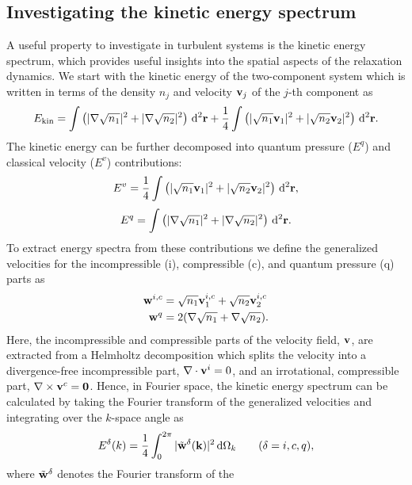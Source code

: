 \subsection{Investigating the kinetic energy spectrum}
A useful property to investigate in turbulent systems is the kinetic energy
spectrum, which provides useful insights into the spatial aspects of the
relaxation dynamics.
We start with the kinetic energy of the two-component system which is written
in terms of the density \(n_j\) and velocity \(\vb{v}_j\) of the \(j\)-th
component as
\begin{align}
    E_\mathrm{kin} = \int \left(|\nabla\sqrt{n_1}|^2
    + |\nabla\sqrt{n_2}|^2\right) \, \dd^2\vb{r} 
    + \frac{1}{4}\int \left(|\sqrt{n_1}\vb{v}_1|^2
    + |\sqrt{n_2}\vb{v}_2|^2\right) \, \dd^2\vb{r}.
\end{align}
The kinetic energy can be further decomposed into quantum pressure
(\( E^q\)) and classical velocity (\(E^v\)) contributions:
\begin{align}
    E^v = \frac{1}{4}\int \left(|\sqrt{n_1}\vb{v}_1|^2
    + |\sqrt{n_2}\vb{v}_2|^2\right) \, \dd^2\vb{r},
\end{align}
\begin{align}
    E^q = \int \left(|\nabla\sqrt{n_1}|^2
    + |\nabla\sqrt{n_2}|^2\right) \, \dd^2\vb{r}.
\end{align}
To extract energy spectra from these contributions we define the generalized
velocities for the incompressible (i), compressible (c), and quantum pressure
(q) parts as
\begin{align}
    \vb{w}^{i, c} &= \sqrt{n_1}\vb{v}_1^{i, c} + \sqrt{n_2}\vb{v}_2^{i, c} \\
    \vb{w}^q      &= 2 (\nabla \sqrt{n_1} + \nabla \sqrt{n_2}).
\end{align}
Here, the incompressible and compressible parts of the velocity field,
\(\vb{v}\), are extracted from a Helmholtz decomposition which splits the
velocity into a divergence-free incompressible part,
\(\nabla \cdot \vb{v}^i = 0\), and an irrotational, compressible part,
\(\nabla \times \vb{v}^c=\vb{0}\).
Hence, in Fourier space, the kinetic energy spectrum can be calculated by
taking the Fourier transform of the generalized velocities and integrating over
the \(k\)-space angle as
\begin{align}
    E^\delta(k) = \frac{1}{4} \int_{0}^{2\pi}
    |\tilde{\vb{w}}^\delta(\vb{k})|^2 \, \dd\Omega_k
    \qquad (\delta = i, c, q),
\end{align}
where \(\tilde{\vb{w}}^\delta \) denotes the Fourier transform of the
